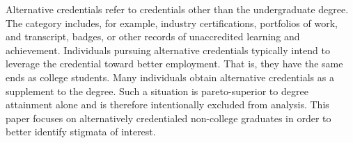 \documentclass[review]{elsarticle}
\begin{document}

Alternative credentials refer to credentials other than the undergraduate degree\cite{brown2017complex}.
The category includes, for example,
industry certifications,
portfolios of work,
and transcript, badges, or other records of unaccredited learning and achievement.
Individuals pursuing alternative credentials typically intend to leverage the credential toward better employment.
That is, they have the same ends as college students.
Many individuals obtain alternative credentials as a supplement to the degree.
Such a situation is pareto-superior to degree attainment alone and is therefore intentionally excluded from analysis.
This paper focuses on alternatively credentialed non-college graduates in order to better identify stigmata of interest.


\end{document}
